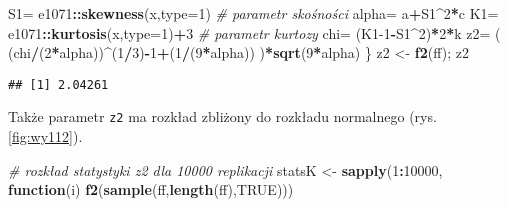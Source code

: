 \documentclass[polish,]{book}
\newenvironment{Shaded}{\begin{snugshade}}{\end{snugshade}}
\newcommand{\CommentTok}[1]{\textcolor[rgb]{0.56,0.35,0.01}{\textit{#1}}}
\newcommand{\ControlFlowTok}[1]{\textcolor[rgb]{0.13,0.29,0.53}{\textbf{#1}}}
\newcommand{\DataTypeTok}[1]{\textcolor[rgb]{0.13,0.29,0.53}{#1}}
\newcommand{\DecValTok}[1]{\textcolor[rgb]{0.00,0.00,0.81}{#1}}
\newcommand{\KeywordTok}[1]{\textcolor[rgb]{0.13,0.29,0.53}{\textbf{#1}}}
\newcommand{\NormalTok}[1]{#1}
\newcommand{\OperatorTok}[1]{\textcolor[rgb]{0.81,0.36,0.00}{\textbf{#1}}}
\newcommand{\OtherTok}[1]{\textcolor[rgb]{0.56,0.35,0.01}{#1}}
\newcommand{\StringTok}[1]{\textcolor[rgb]{0.31,0.60,0.02}{#1}}
\begin{document}
\begin{Shaded}
\begin{Highlighting}[]
\NormalTok{  S1=}\StringTok{ }\NormalTok{e1071}\OperatorTok{::}\KeywordTok{skewness}\NormalTok{(x,}\DataTypeTok{type=}\DecValTok{1}\NormalTok{)   }\CommentTok{# parametr skośności}
\NormalTok{  alpha=}\StringTok{ }\NormalTok{a}\OperatorTok{+}\NormalTok{S1}\OperatorTok{^}\DecValTok{2}\OperatorTok{*}\NormalTok{c}
\NormalTok{  K1=}\StringTok{ }\NormalTok{e1071}\OperatorTok{::}\KeywordTok{kurtosis}\NormalTok{(x,}\DataTypeTok{type=}\DecValTok{1}\NormalTok{)}\OperatorTok{+}\DecValTok{3} \CommentTok{# parametr kurtozy}
\NormalTok{  chi=}\StringTok{ }\NormalTok{(K1}\DecValTok{-1}\OperatorTok{-}\NormalTok{S1}\OperatorTok{^}\DecValTok{2}\NormalTok{)}\OperatorTok{*}\DecValTok{2}\OperatorTok{*}\NormalTok{k}
\NormalTok{  z2=}\StringTok{ }\NormalTok{( (chi}\OperatorTok{/}\NormalTok{(}\DecValTok{2}\OperatorTok{*}\NormalTok{alpha))}\OperatorTok{^}\NormalTok{(}\DecValTok{1}\OperatorTok{/}\DecValTok{3}\NormalTok{)}\OperatorTok{-}\DecValTok{1}\OperatorTok{+}\NormalTok{(}\DecValTok{1}\OperatorTok{/}\NormalTok{(}\DecValTok{9}\OperatorTok{*}\NormalTok{alpha)) )}\OperatorTok{*}\KeywordTok{sqrt}\NormalTok{(}\DecValTok{9}\OperatorTok{*}\NormalTok{alpha)}
\NormalTok{  \}}
\NormalTok{z2 <-}\StringTok{ }\KeywordTok{f2}\NormalTok{(ff); z2}
\end{Highlighting}
\end{Shaded}

\begin{verbatim}
## [1] 2.04261
\end{verbatim}

Także parametr \texttt{z2} ma rozkład zbliżony do rozkładu normalnego (rys. \ref{fig:wy112}).

\begin{Shaded}
\begin{Highlighting}[]
\CommentTok{# rozkład statystyki z2 dla 10000 replikacji}
\NormalTok{statsK <-}\StringTok{ }\KeywordTok{sapply}\NormalTok{(}\DecValTok{1}\OperatorTok{:}\DecValTok{10000}\NormalTok{, }\ControlFlowTok{function}\NormalTok{(i) }\KeywordTok{f2}\NormalTok{(}\KeywordTok{sample}\NormalTok{(ff,}\KeywordTok{length}\NormalTok{(ff),}\OtherTok{TRUE}\NormalTok{)))}
\end{Highlighting}
\end{Shaded}
\end{document}
